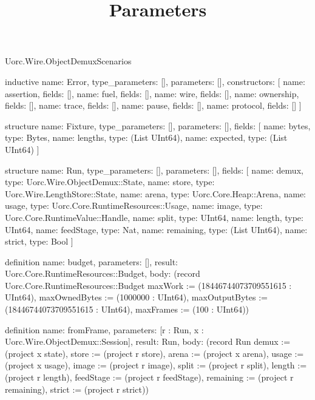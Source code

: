 \begin{lexlean}{Uorc.Wire.ObjectDemuxScenarios}
\title{Parameters}
\begin{semanticmodule}
inductive{
  name: Error,
  type_parameters: [],
  parameters: [],
  constructors: [
    {name: assertion, fields: []},
    {name: fuel, fields: []},
    {name: wire, fields: []},
    {name: ownership, fields: []},
    {name: trace, fields: []},
    {name: pause, fields: []},
    {name: protocol, fields: []}
  ]
}

structure{
  name: Fixture,
  type_parameters: [],
  parameters: [],
  fields: [
    {name: bytes, type: Bytes},
    {name: lengths, type: (List UInt64)},
    {name: expected, type: (List UInt64)}
  ]
}

structure{
  name: Run,
  type_parameters: [],
  parameters: [],
  fields: [
    {name: demux, type: Uorc.Wire.ObjectDemux::State},
    {name: store, type: Uorc.Wire.LengthStore::State},
    {name: arena, type: Uorc.Core.Heap::Arena},
    {name: usage, type: Uorc.Core.RuntimeResources::Usage},
    {name: image, type: Uorc.Core.RuntimeValue::Handle},
    {name: split, type: UInt64},
    {name: length, type: UInt64},
    {name: feedStage, type: Nat},
    {name: remaining, type: (List UInt64)},
    {name: strict, type: Bool}
  ]
}

definition{
  name: budget,
  parameters: [],
  result: Uorc.Core.RuntimeResources::Budget,
  body: (record Uorc.Core.RuntimeResources::Budget {maxWork := (18446744073709551615 : UInt64), maxOwnedBytes := (1000000 : UInt64), maxOutputBytes := (18446744073709551615 : UInt64), maxFrames := (100 : UInt64)})
}

definition{
  name: fromFrame,
  parameters: [r : Run, x : Uorc.Wire.ObjectDemux::Session],
  result: Run,
  body: (record Run {demux := (project x state), store := (project r store), arena := (project x arena), usage := (project x usage), image := (project r image), split := (project r split), length := (project r length), feedStage := (project r feedStage), remaining := (project r remaining), strict := (project r strict)})
}


\end{semanticmodule}
\end{lexlean}
